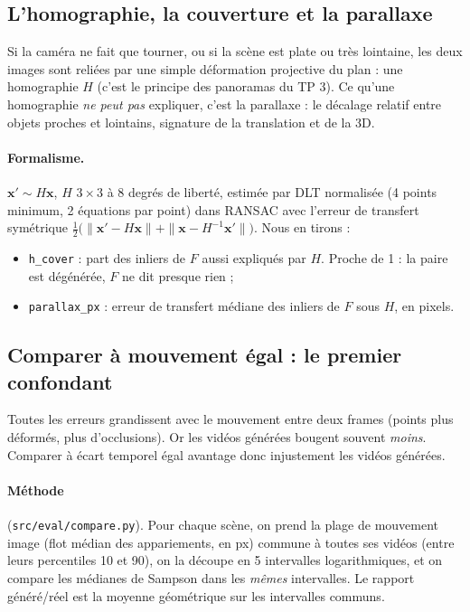 \documentclass[11pt,a4paper]{article}
\newcommand{\x}{\mathbf{x}}
\begin{document}
\subsection{L'homographie, la couverture et la parallaxe}

\begin{intuition}
Si la caméra ne fait que tourner, ou si la scène est plate ou très lointaine, les deux images sont
reliées par une simple déformation projective du plan : une homographie $H$ (c'est le principe des
panoramas du TP 3). Ce qu'une homographie \emph{ne peut pas} expliquer, c'est la parallaxe : le
décalage relatif entre objets proches et lointains, signature de la translation et de la 3D.
\end{intuition}

\paragraph{Formalisme.} $\x'\sim H\x$, $H$ $3\times3$ à 8 degrés de liberté, estimée par DLT normalisée
(4 points minimum, 2 équations par point) dans RANSAC avec l'erreur de transfert symétrique
$\tfrac12\bigl(\|\x'-H\x\|+\|\x-H^{-1}\x'\|\bigr)$. Nous en tirons :
\begin{itemize}
  \item \texttt{h\_cover} : part des inliers de $F$ aussi expliqués par $H$. Proche de 1 : la paire
        est dégénérée, $F$ ne dit presque rien ;
  \item \texttt{parallax\_px} : erreur de transfert médiane des inliers de $F$ sous $H$, en pixels.
\end{itemize}

\subsection{Comparer à mouvement égal : le premier confondant}

\begin{intuition}
Toutes les erreurs grandissent avec le mouvement entre deux frames (points plus déformés, plus
d'occlusions). Or les vidéos générées bougent souvent \emph{moins}. Comparer à écart temporel égal
avantage donc injustement les vidéos générées.
\end{intuition}

\paragraph{Méthode} (\texttt{src/eval/compare.py}). Pour chaque scène, on prend la plage de mouvement
image (flot médian des appariements, en px) commune à toutes ses vidéos (entre leurs percentiles 10 et
90), on la découpe en 5 intervalles logarithmiques, et on compare les médianes de Sampson dans les
\emph{mêmes} intervalles. Le rapport généré/réel est la moyenne géométrique sur les intervalles communs.
\end{document}
